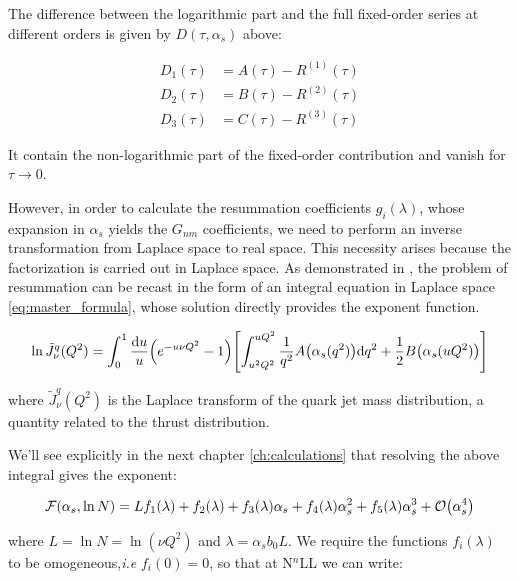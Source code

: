 \documentclass[../main.tex]{subfiles}
\begin{document}
The difference between the logarithmic part and the full fixed-order series at different orders is given by $D(\tau,\alpha_s)$ above:

\begin{equation}
    \begin{split}
        D_1(\tau) &=  A(\tau) - R^{(1)}(\tau)\\
        D_2(\tau) &=  B(\tau) - R^{(2)}(\tau)\\
        D_3(\tau) &=  C(\tau) - R^{(3)}(\tau)
    \end{split}
\end{equation}

It contain the non-logarithmic part of the fixed-order contribution and vanish for $\tau \to 0$.

However, in order to calculate the resummation coefficients $g_i(\lambda)$, whose expansion in $\alpha_s$ yields the $G_{nm}$ coefficients,  we need to perform an inverse transformation from Laplace space to real space.
This necessity arises because the factorization is carried out in Laplace space. As demonstrated in \cite{CATANI19933}, the problem of resummation
can be recast in the form of an integral equation in Laplace space \cref{eq:master_formula},  whose solution directly provides the exponent function.

\begin{equation}\label{eq:master formula}
    \ln \tilde{J}_\nu^q(Q^2) = \int_0^1 \frac{\dd u}{u} \qty(e^{-u \nu Q^2}-1)\qty[ \int_{u^2 Q^2}^{u Q^2} \frac{1}{q^2} A\qty(\alpha_s(q^2)) \dd q^2 + \frac{1}{2} B\qty(\alpha_s(u Q^2))]
\end{equation}

where $\tilde{J}_\nu^q(Q^2)$ is the Laplace transform of the quark jet mass distribution, a quantity related to the thrust distribution.

We'll see explicitly in the next chapter \cref{ch:calculations} that resolving the above integral gives the exponent:

\begin{equation}\label{eq:exponent F}
    \mathcal{F}(\alpha_s,\ln N) = L f_1(\lambda)  + f_2(\lambda) + f_3(\lambda) \alpha_s + f_4(\lambda) \alpha_s^2 + f_5(\lambda) \alpha_s^3 + \order{\alpha_s^4}
\end{equation}

where $L = \ln N = \ln(\nu Q^2)$ and $\lambda = \alpha_s b_0 L$.
We require the functions $f_i(\lambda)$ to be omogeneous,\emph{i.e} $f_i(0)=0$, so that at N$^n$LL we can write:
\end{document}
